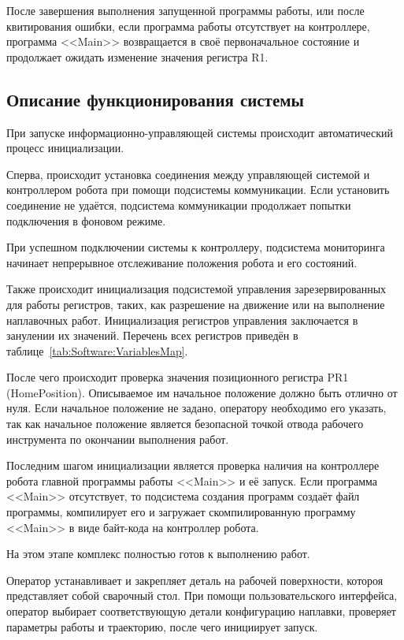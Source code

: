 После завершения выполнения запущенной программы работы, или после квитирования ошибки, если программа работы отсутствует на контроллере, программа <<Main>> возвращается в своё первоначальное состояние и продолжает ожидать изменение значения регистра R1.

\subsection{Описание функционирования системы}
При запуске информационно-управляющей системы происходит автоматический процесс инициализации.

Сперва, происходит установка соединения между управляющей системой и контроллером робота при помощи подсистемы коммуникации.
Если установить соединение не удаётся, подсистема коммуникации продолжает попытки подключения в фоновом режиме.

При успешном подключении системы к контроллеру, подсистема мониторинга начинает непрерывное отслеживание положения робота и его состояний.

Также происходит инициализация подсистемой управления зарезервированных для работы регистров, таких, как разрешение на движение или на выполнение наплавочных работ.
Инициализация регистров управления заключается в занулении их значений.
Перечень всех регистров приведён в таблице~\ref{tab:Software:VariablesMap}.

После чего происходит проверка значения позиционного регистра PR1 (HomePosition).
Описываемое им начальное положение должно быть отлично от нуля.
Если начальное положение не задано, оператору необходимо его указать, так как начальное положение является безопасной точкой отвода рабочего инструмента по окончании выполнения работ.

Последним шагом инициализации является проверка наличия на контроллере робота главной программы работы <<Main>> и её запуск.
Если программа <<Main>> отсутствует, то подсистема создания программ создаёт файл программы, компилирует его и загружает скомпилированную программу <<Main>> в виде байт-кода на контроллер робота.

На этом этапе комплекс полностью готов к выполнению работ.

Оператор устанавливает и закрепляет деталь на рабочей поверхности, котороя представляет собой сварочный стол.
При помощи пользовательского интерфейса, оператор выбирает соответствующую детали конфигурацию наплавки, проверяет параметры работы и траекторию, после чего инициирует запуск.

